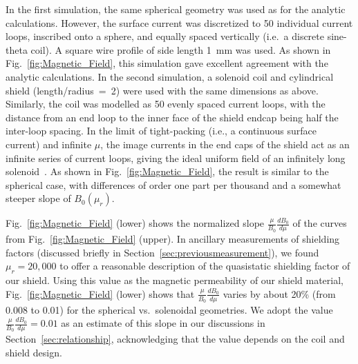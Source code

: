 In the first simulation, the same spherical geometry was used as for
the analytic calculations.  However, the surface current was
discretized to 50 individual current loops, inscribed onto a sphere,
and equally spaced vertically (i.e.~a discrete sine-theta coil).  A
square wire profile of side length 1~mm was used.  As shown in
Fig.~\ref{fig:Magnetic_Field}, this simulation gave excellent
agreement with the analytic calculations.  In the second simulation, a
solenoid coil and cylindrical shield (length/radius~=~2) were used
with the same dimensions as above.  Similarly, the coil was modelled
as 50 evenly spaced current loops, with the distance from an end loop
to the inner face of the shield endcap being half the inter-loop
spacing.  In the limit of tight-packing (i.e., a continuous surface
current) and infinite $\mu$, the image currents in the end caps of the
shield act as an infinite series of current loops, giving the ideal
uniform field of an infinitely long
solenoid~\cite{bib:lambert,bib:sumner}.  As shown in
Fig.~\ref{fig:Magnetic_Field}, the result is similar to the spherical
case, with differences of order one part per thousand and a somewhat
steeper slope of $B_0(\mu_r)$.

Fig.~\ref{fig:Magnetic_Field} (lower) shows the normalized slope
$\frac{\mu}{B_0}\frac{dB_0}{d\mu}$ of the curves from
Fig.~\ref{fig:Magnetic_Field} (upper).  In ancillary measurements of
shielding factors (discussed briefly in
Section~\ref{sec:previousmeasurement}), we found $\mu_r=20,000$ to
offer a reasonable description of the quasistatic shielding factor of
our shield.  Using this value as the magnetic permeability of our
shield material, Fig.~\ref{fig:Magnetic_Field} (lower) shows that
$\frac{\mu}{B_0}\frac{dB_0}{d\mu}$ varies by about 20\% (from 0.008 to
0.01) for the spherical vs.~solenoidal geometries.  We adopt the value
$\frac{\mu}{B_0}\frac{dB_0}{d\mu}=0.01$ as an estimate of this slope
in our discussions in Section~\ref{sec:relationship}, acknowledging
that the value depends on the coil and shield design.

